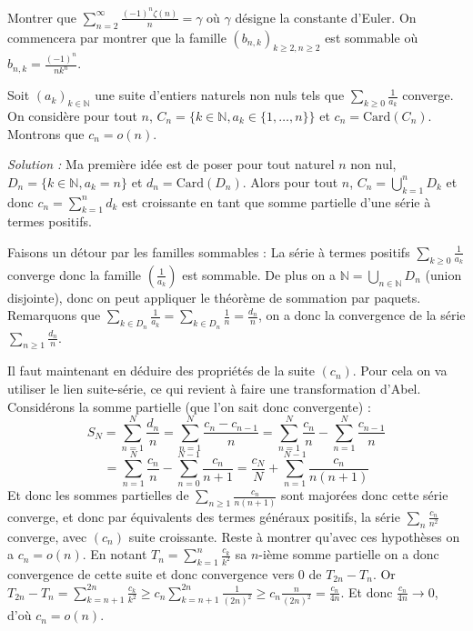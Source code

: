 \begin{exercice}
Montrer que $\sum_{n=2}^{\infty}\frac{(-1)^{n}\zeta(n)}{n}=\gamma$ où $\gamma$ désigne la constante d'Euler.
On commencera par montrer que la famille $(b_{n,k})_{k\ge2,n\ge2}$ est sommable où $b_{n,k}=\frac{(-1)^{n}}{nk^{n}}$.
\end{exercice}

\begin{exercice}[title={Complément : Exercice corrigé}]
Soit $(a_{k})_{k\in \mathbb{N}}$ une suite d'entiers naturels non nuls tels que $\sum_{k\ge0}\frac{1}{a_{k}}$ converge.
On considère pour tout $n$, $C_{n} = \{k\in\mathbb{N}, a_{k}\in\{1,\dots,n\}\}$ et $c_{n}=\text{Card}(C_{n})$.
Montrons que $c_{n}=o(n)$.

\textit{Solution :}
Ma première idée est de poser pour tout naturel $n$ non nul, $D_{n}=\{k\in\mathbb{N}, a_{k}=n\}$ et $d_{n}=\text{Card}(D_{n})$.
Alors pour tout $n$, $C_{n}=\bigcup_{k=1}^{n}D_{k}$ et donc $c_{n}=\sum_{k=1}^{n}d_{k}$ est croissante en tant que somme partielle d'une série à termes positifs.

Faisons un détour par les familles sommables :
La série à termes positifs $\sum_{k\ge0}\frac{1}{a_{k}}$ converge donc la famille $(\frac{1}{a_{k}})$ est sommable.
De plus on a $\mathbb{N}=\bigcup_{n\in \mathbb{N}} D_{n}$ (union disjointe), donc on peut appliquer le théorème de sommation par paquets.
Remarquons que $\sum_{k\in D_{n}} \frac{1}{a_{k}}=\sum_{k\in D_{n}} \frac{1}{n}=\frac{d_{n}}{n}$, on a donc la convergence de la série $\sum_{n\ge1}\frac{d_{n}}{n}$.

Il faut maintenant en déduire des propriétés de la suite $(c_{n})$.
Pour cela on va utiliser le lien suite-série, ce qui revient à faire une transformation d'Abel.
Considérons la somme partielle (que l'on sait donc convergente) :
$$ S_{N}=\sum_{n=1}^{N}\frac{d_{n}}{n}=\sum_{n=1}^{N}\frac{c_{n}-c_{n-1}}{n}=\sum_{n=1}^{N}\frac{c_{n}}{n}-\sum_{n=1}^{N}\frac{c_{n-1}}{n} $$
$$ =\sum_{n=1}^{N}\frac{c_{n}}{n}-\sum_{n=0}^{N-1}\frac{c_{n}}{n+1}=\frac{c_{N}}{N}+\sum_{n=1}^{N-1}\frac{c_{n}}{n(n+1)} $$
Et donc les sommes partielles de $\sum_{n\ge1}\frac{c_{n}}{n(n+1)}$ sont majorées donc cette série converge, et donc par équivalents des termes généraux positifs, la série $\sum_{n}\frac{c_{n}}{n^{2}}$ converge, avec $(c_{n})$ suite croissante.
Reste à montrer qu'avec ces hypothèses on a $c_{n}=o(n)$.
En notant $T_{n}=\sum_{k=1}^{n}\frac{c_{k}}{k^{2}}$ sa $n$-ième somme partielle on a donc convergence de cette suite et donc convergence vers 0 de $T_{2n}-T_{n}$.
Or $T_{2n}-T_{n}=\sum_{k=n+1}^{2n}\frac{c_{k}}{k^{2}}\ge c_{n}\sum_{k=n+1}^{2n}\frac{1}{(2n)^{2}}\ge c_{n}\frac{n}{(2n)^{2}} = \frac{c_n}{4n}$.
Et donc $\frac{c_n}{4n} \to 0$, d'où $c_{n}=o(n)$.
\end{exercice}

